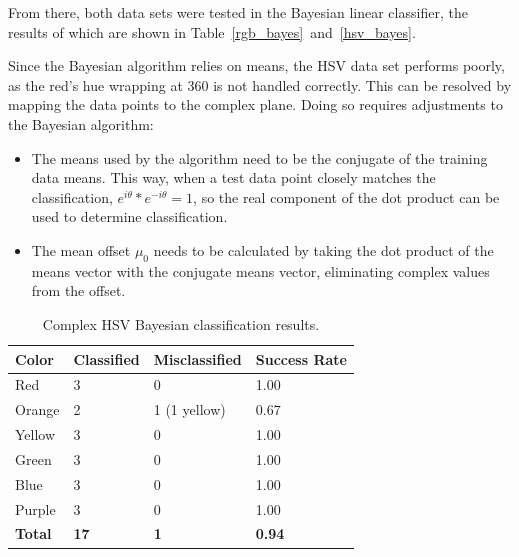 \documentclass[twoside]{IEEEtran}
\begin{document}
From there, both data sets were tested in the Bayesian linear classifier, the results of which
are shown in Table~\ref{rgb_bayes}~and~\ref{hsv_bayes}.

Since the Bayesian algorithm relies on means, the HSV data set performs poorly, as the red's hue
wrapping at 360 is not handled correctly. This can be resolved by mapping the data points to the
complex plane. Doing so requires adjustments to the Bayesian algorithm:
\begin{itemize}
    \item The means used by the algorithm need to be the conjugate of the training data means.
          This way, when a test data point closely matches the classification, \( e^{i\theta} * e^{-i\theta} = 1 \),
          so the real component of the dot product can be used to determine classification.

    \item The mean offset \( \mu_0 \) needs to be calculated by taking the dot product of the means vector
          with the conjugate means vector, eliminating complex values from the offset.
\end{itemize}

\begin{table}[!t]
    \centering

    \caption{Complex HSV Bayesian classification results.}%
    \label{hsv_complex_bayes}
    \begin{tabular}{ l l l l }
        \toprule
        \bfseries Color & \bfseries Classified & \bfseries Misclassified & \bfseries Success Rate \\
        \midrule
        Red             & 3                    & 0                       & 1.00                   \\
        Orange          & 2                    & 1 (1 yellow)            & 0.67                   \\
        Yellow          & 3                    & 0                       & 1.00                   \\
        Green           & 3                    & 0                       & 1.00                   \\
        Blue            & 3                    & 0                       & 1.00                   \\
        Purple          & 3                    & 0                       & 1.00                   \\
        \midrule
        \bfseries Total & \bfseries 17         & \bfseries 1             & \bfseries 0.94         \\
        \bottomrule
    \end{tabular}
\end{table}
\end{document}
